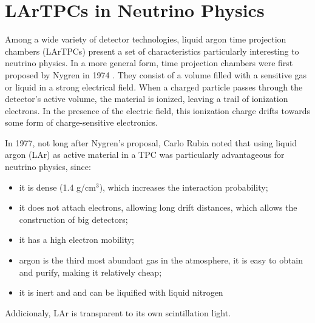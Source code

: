 \section{LArTPCs in Neutrino Physics}
Among a wide variety of detector technologies, liquid argon time projection chambers (LArTPCs) present a set of characteristics particularly interesting to neutrino physics. 
In a more general form, time projection chambers were first proposed by Nygren in 1974 \cite{Nygren}. They consist of a volume filled with a sensitive gas or liquid in a strong electrical field. When a charged particle passes through the detector's active volume, the material is ionized, leaving a trail of ionization electrons. In the presence of the electric field, this ionization charge drifts towards some form of charge-sensitive electronics.

In 1977, not long after Nygren's proposal, Carlo Rubia noted that using liquid argon (LAr) as active material in a TPC was particularly advantageous for neutrino physics, since:
\begin{itemize}
	\item it is dense (1.4 g/cm$^3$), which increases the interaction probability;
 	\item it does not attach electrons, allowing long drift distances, which allows the construction of big detectors;
  	\item it has a high electron mobility;
   	\item argon is the third most abundant gas in the atmosphere, it is easy to obtain and purify, making it relatively cheap;
  	\item it is inert and and can be liquified with liquid nitrogen \cite{Rubia_ANewConcept}
\end{itemize}
Addicionaly, LAr is transparent to its own scintillation light. 


